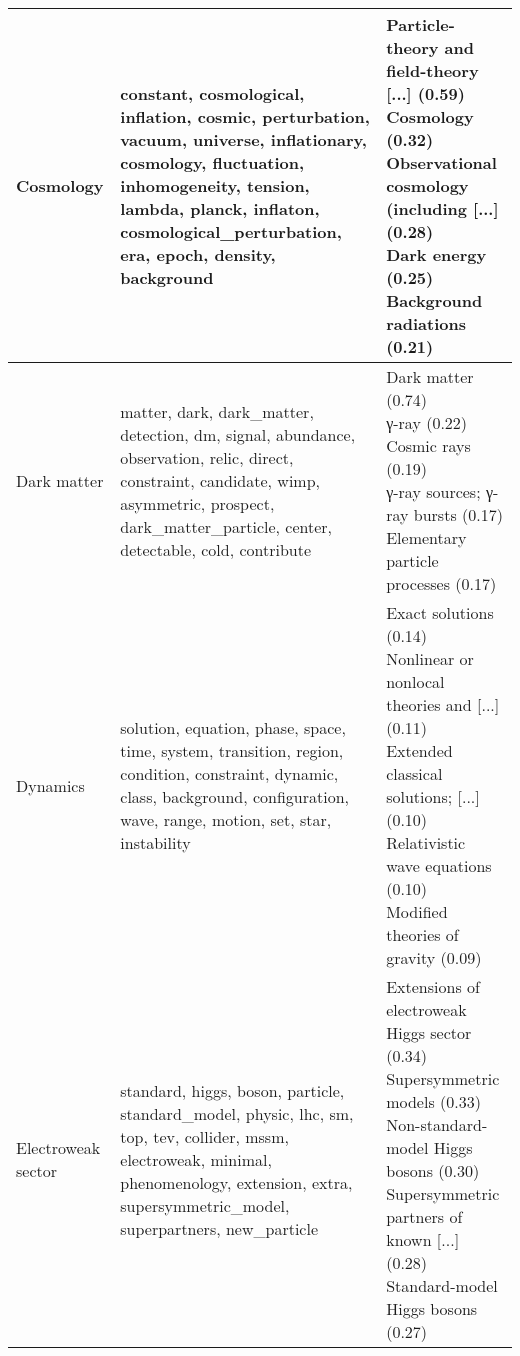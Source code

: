 \begin{longtable}{p{}|b{}|b{}}
                        Cosmology &                           constant, cosmological, inflation, cosmic, perturbation, vacuum, universe, inflationary, cosmology, fluctuation, inhomogeneity, tension, lambda, planck, inflaton, cosmological\_perturbation, era, epoch, density, background &                                                                 \shortstack[l]{Particle-theory and field-theory [...] (0.59)\\ Cosmology (0.32)\\ Observational cosmology (including [...] (0.28)\\ Dark energy (0.25)\\ Background radiations (0.21)}\\ \hline
                      Dark matter &                                                matter, dark, dark\_matter, detection, dm, signal, abundance, observation, relic, direct, constraint, candidate, wimp, asymmetric, prospect, dark\_matter\_particle, center, detectable, cold, contribute &                                                                                                     \shortstack[l]{Dark matter (0.74)\\ γ-ray (0.22)\\ Cosmic rays (0.19)\\ γ-ray sources; γ-ray bursts (0.17)\\ Elementary particle processes (0.17)}\\ \hline
                         Dynamics &                                                                        solution, equation, phase, space, time, system, transition, region, condition, constraint, dynamic, class, background, configuration, wave, range, motion, set, star, instability &                                       \shortstack[l]{Exact solutions (0.14)\\ Nonlinear or nonlocal theories and [...] (0.11)\\ Extended classical solutions; [...] (0.10)\\ Relativistic wave equations (0.10)\\ Modified theories of gravity (0.09)}\\ \hline
               Electroweak sector &                                                 standard, higgs, boson, particle, standard\_model, physic, lhc, sm, top, tev, collider, mssm, electroweak, minimal, phenomenology, extension, extra, supersymmetric\_model, superpartners, new\_particle &                             \shortstack[l]{Extensions of electroweak Higgs sector (0.34)\\ Supersymmetric models (0.33)\\ Non-standard-model Higgs bosons (0.30)\\ Supersymmetric partners of known [...] (0.28)\\ Standard-model Higgs bosons (0.27)}\\ \hline

\end{longtable}
